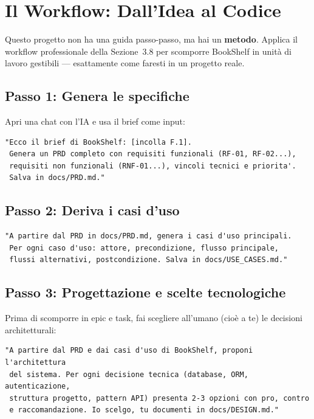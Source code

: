 \section{Il Workflow: Dall'Idea al Codice}

Questo progetto non ha una guida passo-passo, ma hai un \textbf{metodo}. Applica il workflow professionale della Sezione~3.8 per scomporre BookShelf in unità di lavoro gestibili --- esattamente come faresti in un progetto reale.

\subsection{Passo 1: Genera le specifiche}

Apri una chat con l'IA e usa il brief come input:

\begin{lstlisting}[language={}]
"Ecco il brief di BookShelf: [incolla F.1].
 Genera un PRD completo con requisiti funzionali (RF-01, RF-02...),
 requisiti non funzionali (RNF-01...), vincoli tecnici e priorita'.
 Salva in docs/PRD.md."
\end{lstlisting}

\subsection{Passo 2: Deriva i casi d'uso}

\begin{lstlisting}[language={}]
"A partire dal PRD in docs/PRD.md, genera i casi d'uso principali.
 Per ogni caso d'uso: attore, precondizione, flusso principale,
 flussi alternativi, postcondizione. Salva in docs/USE_CASES.md."
\end{lstlisting}

\subsection{Passo 3: Progettazione e scelte tecnologiche}

Prima di scomporre in epic e task, fai scegliere all'umano (cioè a te) le decisioni architetturali:

\begin{lstlisting}[language={}]
"A partire dal PRD e dai casi d'uso di BookShelf, proponi l'architettura
 del sistema. Per ogni decisione tecnica (database, ORM, autenticazione,
 struttura progetto, pattern API) presenta 2-3 opzioni con pro, contro
 e raccomandazione. Io scelgo, tu documenti in docs/DESIGN.md."
\end{lstlisting}

